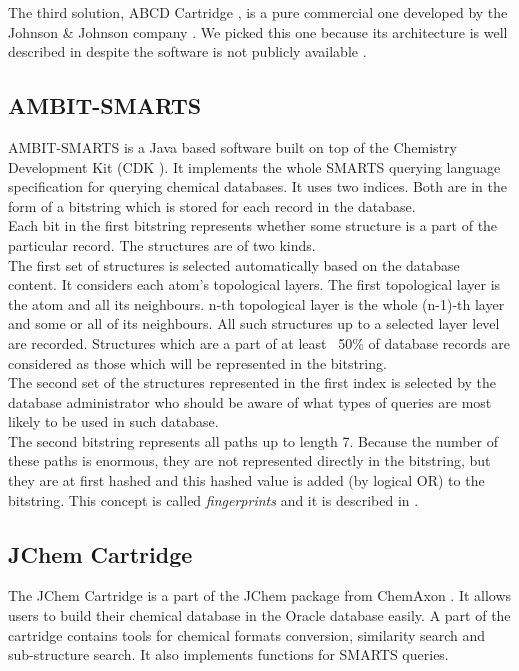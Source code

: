 The third solution, ABCD Cartridge \cite{ABCD}, is a pure commercial one developed by the Johnson \& Johnson company \cite{JJ}. We picked this one because its architecture is well described in \cite{ABCD} despite the software is not publicly available .

\subsection{AMBIT-SMARTS}

AMBIT-SMARTS is a Java based software built on top of the Chemistry Development Kit (CDK \cite{CDK}). It implements the whole SMARTS querying language specification \cite{SMARTS} for querying chemical databases. It uses two indices. Both are in the form of a bitstring which is stored for each record in the database.\\

Each bit in the first bitstring represents whether some structure is a part of the particular record. The structures are of two kinds.\\

The first set of structures is selected automatically based on the database content. It considers each atom’s topological layers. The first topological layer is the atom and all its neighbours. n-th topological layer is the whole (n-1)-th layer and some or all of its neighbours. All such structures up to a selected layer level are recorded. Structures which are a part of at least ~50\% of database records are considered as those which will be represented in the bitstring.\\

The second set of the structures represented in the first index is selected by the database administrator who should be aware of what types of queries are most likely to be used in such database.\\

The second bitstring represents all paths up to length 7. Because the number of these paths is enormous, they are not represented directly in the bitstring, but they are at first hashed and this hashed value is added (by logical OR) to the bitstring. This concept is called \textit{fingerprints} and it is described in \cite{fingerprints}.

\subsection{JChem Cartridge}

The JChem Cartridge is a part of the JChem package from ChemAxon \cite{Chemaxon}. It allows users to build their chemical database in the Oracle database easily. A part of the cartridge contains tools for chemical formats conversion, similarity search and sub-structure search. It also implements functions for SMARTS queries.\\


